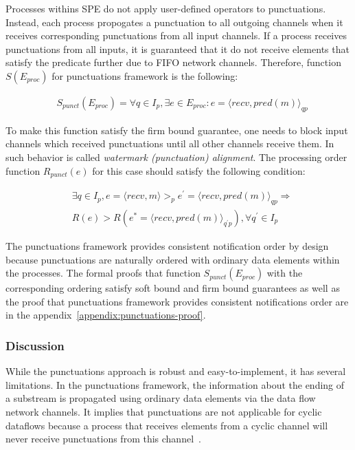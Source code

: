 Processes withins SPE do not apply user-defined operators to punctuations. Instead, each process propogates a punctuation to all outgoing channels when it receives corresponding punctuations from all input channels. If a process receives punctuations from all inputs, it is guaranteed that it do not receive elements that satisfy the predicate further due to FIFO network channels. Therefore, function $S(E_{proc})$ for punctuations framework is the following:

\begin{align*}
& S_{punct}(E_{proc}) = \forall q \in I_p, \exists e \in E_{proc} : e = \langle recv,pred(m)\rangle_{qp}
\end{align*}

To make this function satisfy the firm bound guarantee, one needs to block input channels which received punctuations until all other channels receive them. In~\cite{Carbone:2017:SMA:3137765.3137777} such behavior is called {\em watermark (punctuation) alignment}. The processing order function $R_{punct}(e)$ for this case should satisfy the following condition:

\begin{align*}
& \exists q \in I_p, e = \langle recv,m \rangle >_p e^{'} = \langle recv,pred(m)\rangle_{qp} \Longrightarrow \\ 
& R(e) > R(e^{*}= \langle recv,pred(m) \rangle_{q^{'}p}), \forall q^{'} \in I_p
\end{align*}

The punctuations framework provides consistent notification order by design because punctuations are naturally ordered with ordinary data elements within the processes. The formal proofs that function $S_{punct}(E_{proc})$ with the corresponding ordering satisfy soft bound and firm bound guarantees as well as the proof that punctuations framework provides consistent notifications order are in the appendix~\ref{appendix:punctuations-proof}.

\subsubsection{Discussion}

While the punctuations approach is robust and easy-to-implement, it has several limitations. In the punctuations framework, the information about the ending of a substream is propagated using ordinary data elements via the data flow network channels. It implies that punctuations are not applicable for cyclic dataflows because a process that receives elements from a cyclic channel will never receive punctuations from this channel~\cite{carbone2018scalable}.

